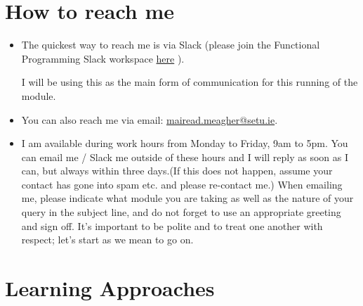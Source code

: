 \documentclass{article}
\begin{document}
\section{How to reach me}
\begin{itemize}
    \item The quickest way to reach me is via Slack (please join the Functional Programming  Slack workspace  
    \href{https://join.slack.com/t/functionalpro-5ox7019/shared_invite/zt-1ng7ff89t-ft1pWDBPPwM1fI4Cbq8A_w}{here} ).  

    I will be using  this  as the main form of communication for this running of the module. 

    \item You can also reach me via email: \href{mailto:mairead.meagher@setu.ie}{mairead.meagher@setu.ie}. 
    \item I am available during work hours from Monday to Friday, 9am to 5pm. You can email me / Slack me outside 
    of these hours and I will reply as soon as I can, 
but always within three days.(If this does not happen, assume your contact has gone into spam etc. and please re-contact me.) 
When emailing me, please indicate what module you are taking as well as the nature of your query in the 
subject line, and do not forget to use an appropriate greeting and sign off. 
It’s important to be polite and to treat one another with 
respect; let’s start as we mean to go on.
\end{itemize}
\pagebreak
\section{Learning Approaches}
\end{document}
